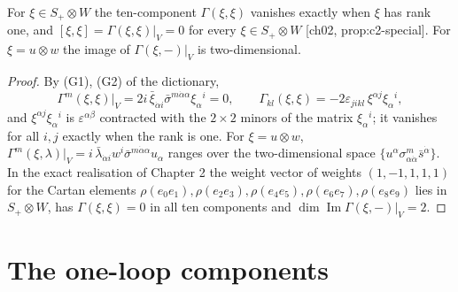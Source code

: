 \begin{lemma}
\label{lem:o-rankone}
For $\xi\in S_+\otimes W$ the ten-component $\Gamma(\xi,\xi)$ vanishes exactly when $\xi$ has rank one, and $[\xi,\xi]=\Gamma(\xi,\xi)|_V=0$ for every $\xi\in S_+\otimes W$ [ch02, prop:c2-special]. For $\xi=u\otimes w$ the image of $\Gamma(\xi,-)|_V$ is two-dimensional.
\end{lemma}

\begin{proof}
By (G1), (G2) of the dictionary,
\[
\Gamma^m(\xi,\xi)\big|_V=2i\,\bar\xi_{\dot\alpha i}\bar\sigma^{m\dot\alpha\alpha}\xi_\alpha{}^i=0,\qquad \Gamma_{kl}(\xi,\xi)=-2\varepsilon_{jikl}\,\xi^{\alpha j}\xi_\alpha{}^i ,
\]
and $\xi^{\alpha j}\xi_\alpha{}^i$ is $\varepsilon^{\alpha\beta}$ contracted with the $2\times2$ minors of the matrix $\xi_\alpha{}^i$; it vanishes for all $i,j$ exactly when the rank is one. For $\xi=u\otimes w$, $\Gamma^m(\xi,\lambda)|_V=i\,\bar\lambda_{\dot\alpha i}w^i\bar\sigma^{m\dot\alpha\alpha}u_\alpha$ ranges over the two-dimensional space $\{u^\alpha\sigma^m_{\alpha\dot\alpha}\bar s^{\dot\alpha}\}$. In the exact realisation of Chapter 2 the weight vector of weights $(1,-1,1,1,1)$ for the Cartan elements $\rho(e_0e_1),\rho(e_2e_3),\rho(e_4e_5),\rho(e_6e_7),\rho(e_8e_9)$ lies in $S_+\otimes W$, has $\Gamma(\xi,\xi)=0$ in all ten components and $\dim\operatorname{Im}\Gamma(\xi,-)|_V=2$.
\end{proof}

\section{The one-loop components}

